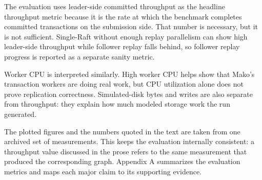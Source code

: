 The evaluation uses leader-side committed throughput as the headline throughput
metric because it is the rate at which the benchmark completes committed
transactions on the submission side. That number is necessary, but it is not
sufficient. Single-Raft without enough replay parallelism can show high
leader-side throughput while follower replay falls behind, so follower replay
progress is reported as a separate sanity metric.

Worker CPU is interpreted similarly. High worker CPU helps show that Mako's
transaction workers are doing real work, but CPU utilization alone does not
prove replication correctness. Simulated-disk bytes and writes are also
separate from throughput: they explain how much modeled storage work the run
generated.

The plotted figures and the numbers quoted in the text are taken from one
archived set of measurements. This keeps the evaluation internally consistent:
a throughput value discussed in the prose refers to the same measurement that
produced the corresponding graph. Appendix A summarizes the evaluation metrics
and maps each major claim to its supporting evidence.

